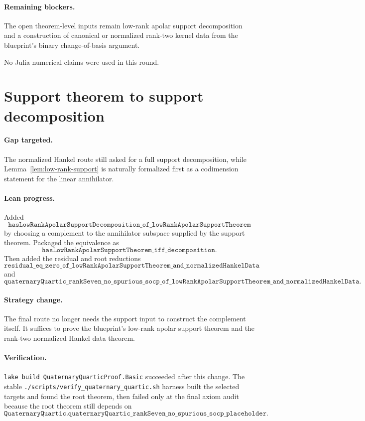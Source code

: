 \documentclass[11pt]{article}
\begin{document}
\paragraph{Remaining blockers.}
The open theorem-level inputs remain low-rank apolar support decomposition and
a construction of canonical or normalized rank-two kernel data from the
blueprint's binary change-of-basis argument.

No Julia numerical claims were used in this round.

\section*{Support theorem to support decomposition}

\paragraph{Gap targeted.}
The normalized Hankel route still asked for a full support decomposition, while
Lemma~\ref{lem:low-rank-support} is naturally formalized first as a
codimension statement for the linear annihilator.

\paragraph{Lean progress.}
Added
\[
\texttt{hasLowRankApolarSupportDecomposition\_of\_lowRankApolarSupportTheorem}
\]
by choosing a complement to the annihilator subspace supplied by the support
theorem.  Packaged the equivalence as
\[
\texttt{hasLowRankApolarSupportTheorem\_iff\_decomposition}.
\]
Then added the residual and root reductions
\[
\texttt{residual\_eq\_zero\_of\_lowRankApolarSupportTheorem\_and\_normalizedHankelData}
\]
and
\[
\texttt{quaternaryQuartic\_rankSeven\_no\_spurious\_socp\_of\_lowRankApolarSupportTheorem\_and\_normalizedHankelData}.
\]

\paragraph{Strategy change.}
The final route no longer needs the support input to construct the complement
itself.  It suffices to prove the blueprint's low-rank apolar support theorem
and the rank-two normalized Hankel data theorem.

\paragraph{Verification.}
\texttt{lake build QuaternaryQuarticProof.Basic} succeeded after this change.
The stable \texttt{./scripts/verify\_quaternary\_quartic.sh} harness built the
selected targets and found the root theorem, then failed only at the final axiom
audit because the root theorem still depends on
\[
\texttt{QuaternaryQuartic.quaternaryQuartic\_rankSeven\_no\_spurious\_socp\_placeholder}.
\]
\end{document}
